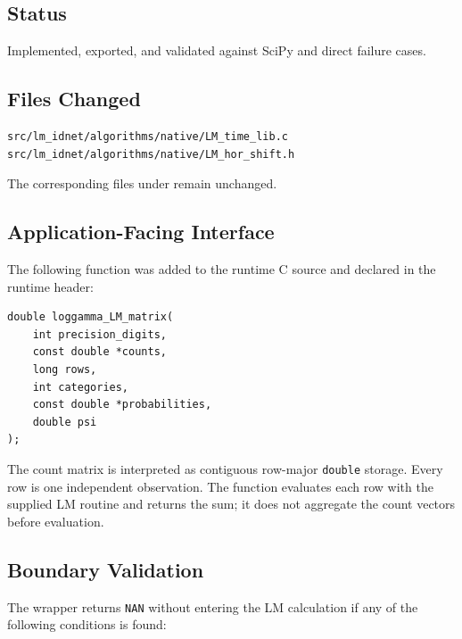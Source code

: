 \documentclass[11pt,a4paper]{article}
\begin{document}
\subsection{Status}

Implemented, exported, and validated against SciPy and direct failure cases.

\subsection{Files Changed}

\begin{verbatim}
src/lm_idnet/algorithms/native/LM_time_lib.c
src/lm_idnet/algorithms/native/LM_hor_shift.h
\end{verbatim}

The corresponding files under  remain unchanged.

\subsection{Application-Facing Interface}

The following function was added to the runtime C source and declared in the
runtime header:

\begin{verbatim}
double loggamma_LM_matrix(
    int precision_digits,
    const double *counts,
    long rows,
    int categories,
    const double *probabilities,
    double psi
);
\end{verbatim}

The count matrix is interpreted as contiguous row-major \texttt{double}
storage. Every row is one independent observation. The function evaluates each
row with the supplied LM routine and returns the sum; it does not aggregate the
count vectors before evaluation.

\subsection{Boundary Validation}

The wrapper returns \texttt{NAN} without entering the LM calculation if any of
the following conditions is found:
\end{document}
